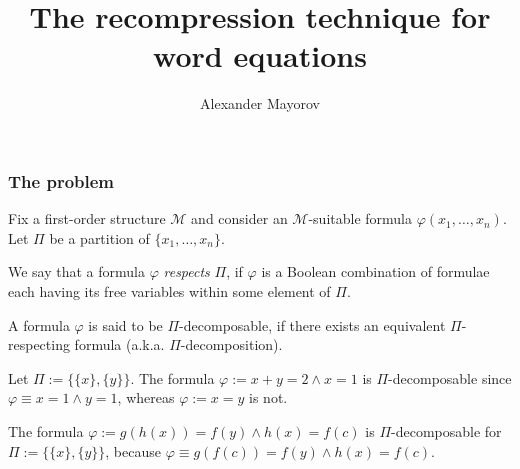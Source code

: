 \documentclass[handout]{beamer}
\title[The recompression technique for WE]{The recompression technique for word equations}
\author{Alexander Mayorov}
\institute[RPTU]{RPTU Kaiserslautern--Landau}
\def\Mstruct{\mathcal{M}}
\def\Q{\mathbb{Q}}
\begin{document}
	
\frame{\titlepage}

\begin{frame}
\frametitle{The problem}

Fix a first-order structure $ \Mstruct $ and consider an $ \Mstruct $-suitable formula $ \varphi(x_1, \dots, x_n) $. Let $ \Pi $ be a partition of $ \{x_1, \dots, x_n\} $.

\begin{definition}[$ \Pi $-decomposable]
	We say that a formula $ \varphi $ \textit{respects} $ \Pi $, if $ \varphi $ is a Boolean combination of formulae each having its free variables within some element of $ \Pi $.
	
	A formula $ \varphi $ is said to be $ \Pi $-decomposable, if there exists an equivalent $ \Pi $-respecting formula (a.k.a. $ \Pi $-decomposition).
\end{definition}

\begin{example}[$ \Mstruct = (\Q, +, <, =, 0, 1) $]
	Let $ \Pi := \{\{x\}, \{y\}\} $. The formula $ \varphi := x + y = 2 \wedge x = 1 $ is $ \Pi $-decomposable since $ \varphi \equiv x = 1 \wedge y = 1 $, whereas $ \varphi := x = y $ is not.
\end{example}

\begin{example}[$ \Mstruct = \EUF $]
	The formula $ \varphi := g(h(x)) = f(y) \wedge h(x) = f(c) $ is $ \Pi $-decomposable for $ \Pi := \{\{x\}, \{y\}\} $, because $ \varphi \equiv g(f(c)) = f(y) \wedge h(x) = f(c) $.
\end{example}

\end{frame}
\end{document}
